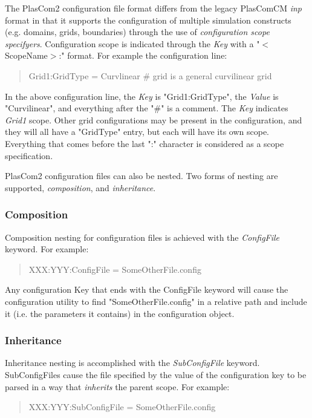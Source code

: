 The Plas\+Com2 configuration file format differs from the legacy Plas\+Com\+CM {\itshape inp} format in that it supports the configuration of multiple simulation constructs (e.\+g. domains, grids, boundaries) through the use of {\itshape configuration scope specifyers}. Configuration scope is indicated through the {\itshape Key} with a "$<$Scope\+Name$>$\+:" format. For example the configuration line\+: ~\newline
\begin{quote}
Grid1\+:Grid\+Type = Curvlinear \# grid is a general curvilinear grid~\newline
\end{quote}


In the above configuration line, the {\itshape Key} is "Grid1\+:Grid\+Type", the {\itshape Value} is "Curvilinear", and everything after the "\#" is a comment. The {\itshape Key} indicates {\itshape Grid1} scope. Other grid configurations may be present in the configuration, and they will all have a "Grid\+Type" entry, but each will have its own scope. Everything that comes before the last "\+:" character is considered as a scope specification.

Plas\+Com2 configuration files can also be nested. Two forms of nesting are supported, {\itshape composition}, and {\itshape inheritance}.\hypertarget{developer_reference_configcomposition}{}\subsubsection{Composition}\label{developer_reference_configcomposition}
Composition nesting for configuration files is achieved with the {\itshape Config\+File} keyword. For example\+:~\newline
 \begin{quote}
X\+X\+X\+:\+Y\+YY\+:Config\+File = Some\+Other\+File.\+config~\newline
\end{quote}


Any configuration Key that ends with the Config\+File keyword will cause the configuration utility to find "Some\+Other\+File.\+config" in a relative path and include it (i.\+e. the parameters it contains) in the configuration object.\hypertarget{developer_reference_configinheritance}{}\subsubsection{Inheritance}\label{developer_reference_configinheritance}
Inheritance nesting is accomplished with the {\itshape Sub\+Config\+File} keyword. Sub\+Config\+Files cause the file specified by the value of the configuration key to be parsed in a way that {\itshape inherits} the parent scope. For example\+:~\newline
 \begin{quote}
X\+X\+X\+:\+Y\+YY\+:Sub\+Config\+File = Some\+Other\+File.\+config~\newline
\end{quote}


